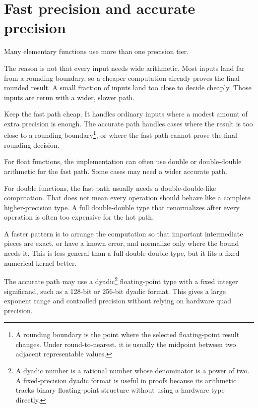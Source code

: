 \documentclass[manuscript, nonacm]{acmart}
\begin{document}


    \section{Fast precision and accurate precision}

    Many elementary functions use more than one precision tier.

    The reason is not that every input needs wide arithmetic. Most inputs land far
    from a rounding boundary, so a cheaper computation already proves the final
    rounded result. A small fraction of inputs land too close to decide cheaply.
    Those inputs are rerun with a wider, slower path.

    Keep the fast path cheap. It handles ordinary inputs where a modest amount of
    extra precision is enough. The accurate path handles cases where
    the result is too close to a rounding boundary\footnote{A rounding boundary is the point where the selected floating-point result changes. Under round-to-nearest, it is usually the midpoint between two adjacent representable values.}, or where the fast path cannot
    prove the final rounding decision.

    For float functions, the implementation can often use double or double-double
    arithmetic for the fast path. Some cases may need a wider accurate path.

    For double functions, the fast path usually needs a double-double-like
    computation. That does not mean every operation should behave like a complete
    higher-precision type. A full double-double type that renormalizes after
    every operation is often too expensive for the hot path.

    A faster pattern is to arrange the computation so that important intermediate
    pieces are exact, or have a known error, and normalize only where the bound
    needs it. This is less general than a full double-double type, but it fits a
    fixed numerical kernel better.

    The accurate path may use a dyadic\footnote{A dyadic number is a rational number whose denominator is a power of two. A fixed-precision dyadic format is useful in proofs because its arithmetic tracks binary floating-point structure without using a hardware type directly.} floating-point type with a fixed integer
    significand, such as a 128-bit or 256-bit dyadic format. This gives a large
    exponent range and controlled precision without relying on hardware quad
    precision.
\end{document}
